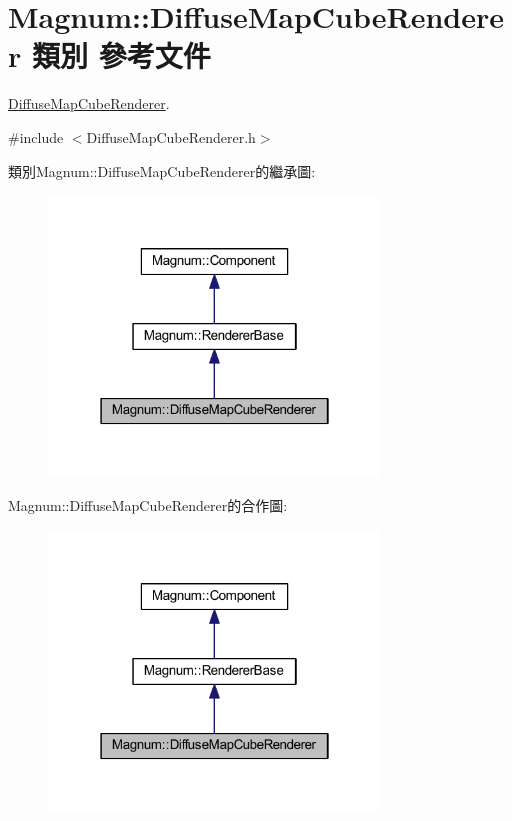\hypertarget{class_magnum_1_1_diffuse_map_cube_renderer}{}\section{Magnum\+:\+:Diffuse\+Map\+Cube\+Renderer 類別 參考文件}
\label{class_magnum_1_1_diffuse_map_cube_renderer}


\hyperlink{class_magnum_1_1_diffuse_map_cube_renderer}{Diffuse\+Map\+Cube\+Renderer}.  




{\ttfamily \#include $<$Diffuse\+Map\+Cube\+Renderer.\+h$>$}



類別\+Magnum\+:\+:Diffuse\+Map\+Cube\+Renderer的繼承圖\+:\nopagebreak
\begin{figure}[H]
\begin{center}
\leavevmode
\includegraphics[width=250pt]{class_magnum_1_1_diffuse_map_cube_renderer__inherit__graph}
\end{center}
\end{figure}


Magnum\+:\+:Diffuse\+Map\+Cube\+Renderer的合作圖\+:\nopagebreak
\begin{figure}[H]
\begin{center}
\leavevmode
\includegraphics[width=250pt]{class_magnum_1_1_diffuse_map_cube_renderer__coll__graph}
\end{center}
\end{figure}
